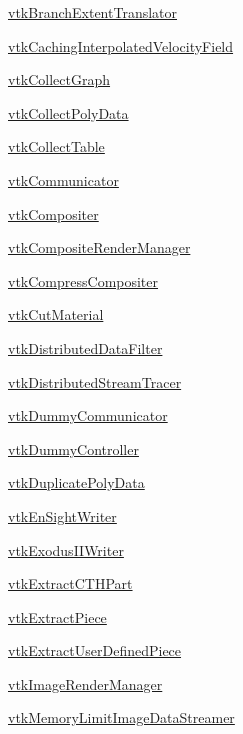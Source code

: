 
\begin{DoxyItemize}
\item \hyperlink{vtkparallel_vtkbranchextenttranslator}{vtk\-Branch\-Extent\-Translator}  
\item \hyperlink{vtkparallel_vtkcachinginterpolatedvelocityfield}{vtk\-Caching\-Interpolated\-Velocity\-Field}  
\item \hyperlink{vtkparallel_vtkcollectgraph}{vtk\-Collect\-Graph}  
\item \hyperlink{vtkparallel_vtkcollectpolydata}{vtk\-Collect\-Poly\-Data}  
\item \hyperlink{vtkparallel_vtkcollecttable}{vtk\-Collect\-Table}  
\item \hyperlink{vtkparallel_vtkcommunicator}{vtk\-Communicator}  
\item \hyperlink{vtkparallel_vtkcompositer}{vtk\-Compositer}  
\item \hyperlink{vtkparallel_vtkcompositerendermanager}{vtk\-Composite\-Render\-Manager}  
\item \hyperlink{vtkparallel_vtkcompresscompositer}{vtk\-Compress\-Compositer}  
\item \hyperlink{vtkparallel_vtkcutmaterial}{vtk\-Cut\-Material}  
\item \hyperlink{vtkparallel_vtkdistributeddatafilter}{vtk\-Distributed\-Data\-Filter}  
\item \hyperlink{vtkparallel_vtkdistributedstreamtracer}{vtk\-Distributed\-Stream\-Tracer}  
\item \hyperlink{vtkparallel_vtkdummycommunicator}{vtk\-Dummy\-Communicator}  
\item \hyperlink{vtkparallel_vtkdummycontroller}{vtk\-Dummy\-Controller}  
\item \hyperlink{vtkparallel_vtkduplicatepolydata}{vtk\-Duplicate\-Poly\-Data}  
\item \hyperlink{vtkparallel_vtkensightwriter}{vtk\-En\-Sight\-Writer}  
\item \hyperlink{vtkparallel_vtkexodusiiwriter}{vtk\-Exodus\-I\-I\-Writer}  
\item \hyperlink{vtkparallel_vtkextractcthpart}{vtk\-Extract\-C\-T\-H\-Part}  
\item \hyperlink{vtkparallel_vtkextractpiece}{vtk\-Extract\-Piece}  
\item \hyperlink{vtkparallel_vtkextractuserdefinedpiece}{vtk\-Extract\-User\-Defined\-Piece}  
\item \hyperlink{vtkparallel_vtkimagerendermanager}{vtk\-Image\-Render\-Manager}  
\item \hyperlink{vtkparallel_vtkmemorylimitimagedatastreamer}{vtk\-Memory\-Limit\-Image\-Data\-Streamer}  

\end{DoxyItemize}
